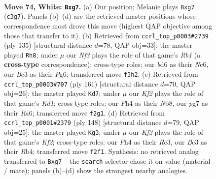 \documentclass[11pt]{article}
\begin{document}
\clearpage

\begin{figure}[p]\centering
\begin{subfigure}{0.46\textwidth}\centering
\resizebox{\linewidth}{!}{%
\newchessgame
\chessboard[
  setfen={8/3k2p1/p2b2rr/Pppb1p1p/2p2P1P/2B1PNP1/1P3K2/2RR4 w - - 20 74},
  showmover=false,
  pgfstyle=straightmove, color=movearrow, markmove={c3-g7}
]}
\caption{}
\end{subfigure}\hfill
\begin{subfigure}{0.46\textwidth}\centering
\resizebox{\linewidth}{!}{%
\newchessgame
\chessboard[
  setfen={rr6/2bk1p2/2n1p1p1/pRPpP3/P4PKP/8/1R2N3/4B3 b - - 28 68},
  showmover=false,
  pgfstyle=straightmove, color=movearrow, markmove={b8-h8}
]}
\caption{}
\end{subfigure}
\\[4pt]
\begin{subfigure}{0.46\textwidth}\centering
\resizebox{\linewidth}{!}{%
\newchessgame
\chessboard[
  setfen={1n1k4/4p3/r2pb1p1/r4pPp/1p2PP1P/1P6/P1R1RBB1/5K2 b - - 13 81},
  showmover=false,
  pgfstyle=straightmove, color=movearrow, markmove={d8-d7}
]}
\caption{}
\end{subfigure}\hfill
\begin{subfigure}{0.46\textwidth}\centering
\resizebox{\linewidth}{!}{%
\newchessgame
\chessboard[
  setfen={8/pp1r2pk/r1b1p2p/4B1p1/1RPP4/P1R2P1P/5KP1/8 w - - 85 75},
  showmover=false,
  pgfstyle=straightmove, color=movearrow, markmove={f2-g3}
]}
\caption{}
\end{subfigure}
\caption{\textbf{Move 74, White: \texttt{Bxg7}.} (a) Our position; Melanie plays \texttt{Bxg7} (\texttt{c3g7}). Panels (b)--(d) are the retrieved master positions whose correspondence most drove this move (highest QAP objective among those that transfer to it). (b) Retrieved from \texttt{ccrl\_top\_p0003\#2739} (ply 135) [structural distance $d$=78, QAP obj=33]: the master played \texttt{Rh8}; under $\mu$ our \emph{Nf3} plays the role of that game's \emph{Rb1} (a \textbf{cross-type} correspondence); cross-type roles: our \emph{b}d6 as their \emph{N}c6, our \emph{B}c3 as their \emph{P}g6; transferred move \texttt{f3h2}. (c) Retrieved from \texttt{ccrl\_top\_p0003\#707} (ply 161) [structural distance $d$=70, QAP obj=26]: the master played \texttt{Kd7}; under $\mu$ our \emph{Kf2} plays the role of that game's \emph{Kd1}; cross-type roles: our \emph{P}h4 as their \emph{N}b8, our \emph{p}g7 as their \emph{R}a6; transferred move \texttt{f2g1}. (d) Retrieved from \texttt{ccrl\_top\_p0001\#2379} (ply 148) [structural distance $d$=79, QAP obj=25]: the master played \texttt{Kg3}; under $\mu$ our \emph{Kf2} plays the role of that game's \emph{Kf2}; cross-type roles: our \emph{P}h4 as their \emph{R}c3, our \emph{B}c3 as their \emph{R}b4; transferred move \texttt{f2f1}. Synthesis: no retrieved analog transferred to \texttt{Bxg7} -- the \texttt{search} selector chose it on value (material / mate); panels (b)--(d) show the strongest nearby analogies.}
\label{fig:thought-m146}
\end{figure}
\end{document}
